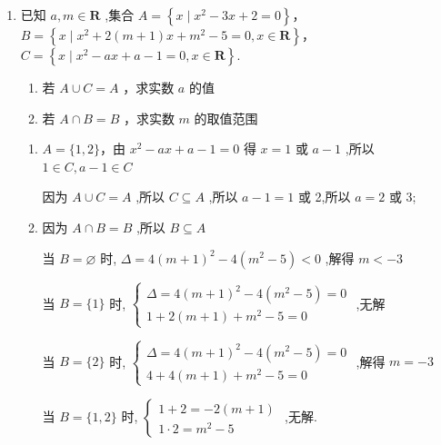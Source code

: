 \begin{enumerate}
\begin{enumerate}
        \item 已知 $a,m \in  \mathbf{R}$ ,集合 $A = \left\{  {x \mid  {x}^{2} - {3x} + 2 = 0}\right\} $，$B = \left\{  {x \mid  {x}^{2} + 2\left( {m + 1}\right) x + {m}^{2} - 5 = 0,x \in  \mathbf{R}}\right\} $，$C =  \left\{  {x \mid  {x}^{2} - {ax} + a - 1 = 0,x \in  \mathbf{R}}\right\} .$
        \begin{enumerate}
            \item 若 $A \cup  C = A$ ，求实数 $a$ 的值
            \item 若 $A \cap  B = B$ ，求实数 $m$ 的取值范围
        \end{enumerate}
        \begin{jieda}
            \begin{enumerate}
                \item $A = \{ 1,2\}$，由 ${x}^{2} - {ax} + a - 1 = 0$ 得 $x = 1$ 或 $a - 1$ ,所以 $1 \in  C,a - 1 \in  C$
                
                因为 $A \cup  C = A$ ,所以 $C \subseteq  A$ ,所以 $a - 1 = 1$ 或 2,所以 $a = 2$ 或 3;
                \item 因为 $A \cap  B = B$ ,所以 $B \subseteq  A$
                
                当 $B = \varnothing$ 时, $\Delta  = 4{\left( m + 1\right) }^{2} - 4\left( {{m}^{2} - 5}\right)  < 0$ ,解得 $m <  - 3$
                
                当 $B = \{ 1\}$ 时, $\left\{  \begin{array}{l} \Delta  = 4{\left( m + 1\right) }^{2} - 4\left( {{m}^{2} - 5}\right)  = 0 \\  1 + 2\left( {m + 1}\right)  + {m}^{2} - 5 = 0 \end{array}\right.$ ,无解
                
                当 $B = \{ 2\}$ 时, $\left\{  \begin{array}{l} \Delta  = 4{\left( m + 1\right) }^{2} - 4\left( {{m}^{2} - 5}\right)  = 0 \\  4 + 4\left( {m + 1}\right)  + {m}^{2} - 5 = 0 \end{array}\right.$ ,解得 $m =  - 3$
                
                当 $B = \{ 1,2\}$ 时, $\left\{  \begin{array}{l} 1 + 2 =  - 2\left( {m + 1}\right) \\  1 \cdot  2 = {m}^{2} - 5 \end{array}\right.$ ,无解.
                

\end{enumerate}
\end{jieda}
\end{enumerate}
\end{enumerate}
